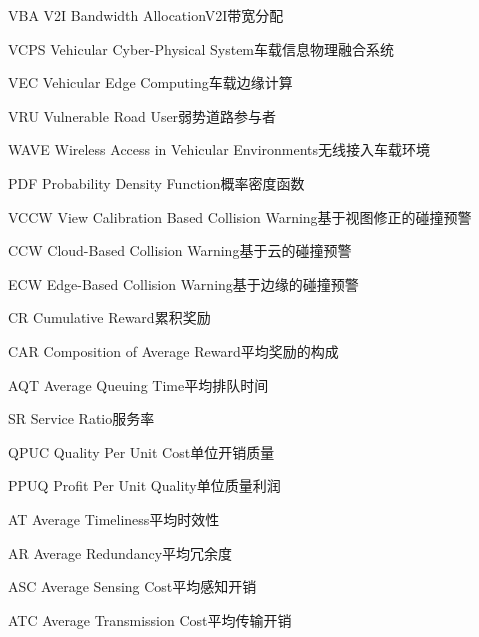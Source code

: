 \begin{abbreviate}[0mm][18mm]
\item[VBA] V2I Bandwidth Allocation\hspace{1em}V2I带宽分配
\item[VCPS] Vehicular Cyber-Physical System\hspace{1em}车载信息物理融合系统
\item[VEC] Vehicular Edge Computing\hspace{1em}车载边缘计算
\item[VRU] Vulnerable Road User\hspace{1em}弱势道路参与者
\item[WAVE] Wireless Access in Vehicular Environments\hspace{1em}无线接入车载环境
\item[PDF] Probability Density Function\hspace{1em}概率密度函数
\item[VCCW] View Calibration Based Collision Warning\hspace{1em}基于视图修正的碰撞预警
\item[CCW] Cloud-Based Collision Warning\hspace{1em}基于云的碰撞预警
\item[ECW] Edge-Based Collision Warning\hspace{1em}基于边缘的碰撞预警
\item[CR] Cumulative Reward\hspace{1em}累积奖励
\item[CAR] Composition of Average Reward\hspace{1em}平均奖励的构成
\item[AQT] Average Queuing Time\hspace{1em}平均排队时间
\item[SR] Service Ratio\hspace{1em}服务率
\item[QPUC] Quality Per Unit Cost\hspace{1em}单位开销质量
\item[PPUQ] Proﬁt Per Unit Quality\hspace{1em}单位质量利润
\item[AT] Average Timeliness\hspace{1em}平均时效性
\item[AR] Average Redundancy\hspace{1em}平均冗余度
\item[ASC] Average Sensing Cost\hspace{1em}平均感知开销
\item[ATC] Average Transmission Cost\hspace{1em}平均传输开销

\end{abbreviate}
